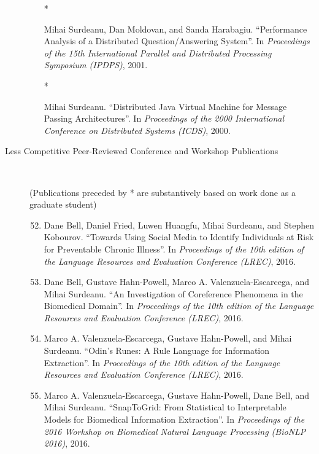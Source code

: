 \documentclass[10pt]{article}
\newcommand{\ve}[1]{{\em #1}} %
\newcommand{\ti}[1]{``#1''} %
\begin{document}
\begin{description}
\begin{enumerate}
\item
[* \addtocounter{enumi}{1}\theenumi ]
Mihai Surdeanu, Dan Moldovan, and Sanda Harabagiu.  \ti{Performance Analysis of a Distributed Question/Answering System}.  In \ve{Proceedings of the 15th International Parallel and Distributed Processing Symposium (IPDPS)}, 2001.

\item
[* \addtocounter{enumi}{1}\theenumi ]
Mihai Surdeanu.  \ti{Distributed Java Virtual Machine for Message Passing Architectures}.  In \ve{Proceedings of the 2000 International Conference on Distributed Systems (ICDS)}, 2000.



\end{enumerate}

\item [Less Competitive Peer-Reviewed Conference and Workshop Publications]\

(Publications preceded by * are substantively based on work done as a graduate student)

\begin{enumerate}
\setcounter{enumi}{51}

\item
Dane Bell, Daniel Fried, Luwen Huangfu, Mihai Surdeanu, and Stephen Kobourov.  \ti{Towards Using Social Media to Identify Individuals at Risk for Preventable Chronic Illness}.  In \ve{Proceedings of the 10th edition of the Language Resources and Evaluation Conference (LREC)}, 2016.

\item
Dane Bell, Gustave Hahn-Powell, Marco A. Valenzuela-Escarcega, and Mihai Surdeanu.  \ti{An Investigation of Coreference Phenomena in the Biomedical Domain}.  In \ve{Proceedings of the 10th edition of the Language Resources and Evaluation Conference (LREC)}, 2016.

\item
Marco A. Valenzuela-Escarcega, Gustave Hahn-Powell, and Mihai Surdeanu.  \ti{Odin's Runes: A Rule Language for Information Extraction}.  In \ve{Proceedings of the 10th edition of the Language Resources and Evaluation Conference (LREC)}, 2016.

\item
Marco A. Valenzuela-Escarcega, Gustave Hahn-Powell, Dane Bell, and Mihai Surdeanu.  \ti{SnapToGrid: From Statistical to Interpretable Models for Biomedical Information Extraction}.  In \ve{Proceedings of the 2016 Workshop on Biomedical Natural Language Processing (BioNLP 2016)}, 2016.


\end{enumerate}
\end{description}
\end{document}
